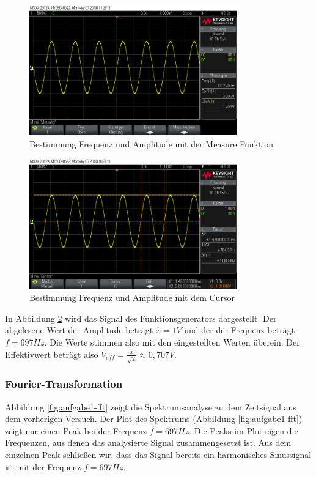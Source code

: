 \documentclass[a4paper]{article}
\begin{document}
\begin{figure}[H]
    \centering
    \includegraphics[width=0.8\textwidth]{aufgabe1_meas.png}
    \caption{Bestimmung Frequenz und Amplitude mit der Measure Funktion}
    \label{fig:meas-freq-ampl}
\end{figure}

\begin{figure}[H]
    \centering
    \includegraphics[width=0.8\textwidth]{aufgabe1_cursor.png}
    \caption{Bestimmung Frequenz und Amplitude mit dem Cursor}
    \label{fig:cursor-freq-ampl}
\end{figure}


In Abbildung \ref{fig:cursor-freq-ampl} wird das Signal des Funktionsgenerators dargestellt. Der abgelesene Wert der Amplitude beträgt $\hat{x}=1\si{V}$ und der der Frequenz beträgt $f=697\si{Hz}$. Die Werte stimmen also mit den eingestellten Werten überein.
Der Effektivwert beträgt also $V_\textit{eff}=\frac{\hat{x}}{\sqrt{2}}\approx0,707\si{V}$.

\subsubsection{Fourier-Transformation}
Abbildung \ref{fig:aufgabe1-fft} zeigt die Spektrumsanalyse zu dem Zeitsignal aus dem \hyperref[sec:harmonische-signale]{vorherigen Versuch}.
Der Plot des Spektrums (Abbildung \ref{fig:aufgabe1-fft}) zeigt nur einen Peak bei der  Frequenz $f=697\si{Hz}$. Die Peaks im Plot eigen die Frequenzen, aus denen das analysierte Signal zusammengesetzt ist. Aus dem einzelnen Peak schließen wir, dass das Signal bereits ein harmonisches Sinussignal ist mit der Frequenz $f=697\si{Hz}$.
\end{document}
